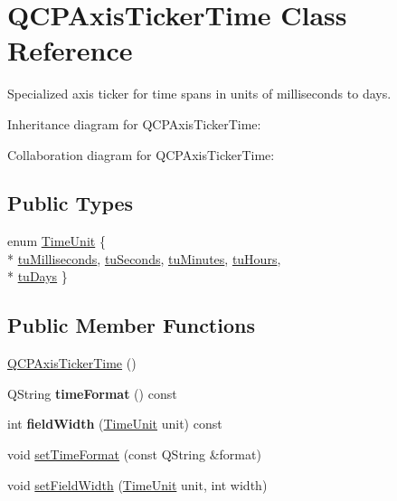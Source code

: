 \hypertarget{classQCPAxisTickerTime}{}\section{Q\+C\+P\+Axis\+Ticker\+Time Class Reference}
\label{classQCPAxisTickerTime}


Specialized axis ticker for time spans in units of milliseconds to days.  




Inheritance diagram for Q\+C\+P\+Axis\+Ticker\+Time\+:


Collaboration diagram for Q\+C\+P\+Axis\+Ticker\+Time\+:
\subsection*{Public Types}
\begin{DoxyCompactItemize}
\item 
enum \hyperlink{classQCPAxisTickerTime_a5c48ded8c6d3a1aca9b68219469fea3e}{Time\+Unit} \{ \\*
\hyperlink{classQCPAxisTickerTime_a5c48ded8c6d3a1aca9b68219469fea3ea809db637d2a7f601287c8790facc25cf}{tu\+Milliseconds}, 
\hyperlink{classQCPAxisTickerTime_a5c48ded8c6d3a1aca9b68219469fea3ea22b2c1842215272ae827eea2d1cc037d}{tu\+Seconds}, 
\hyperlink{classQCPAxisTickerTime_a5c48ded8c6d3a1aca9b68219469fea3ea682de6640daef46cffd8a080348d7d00}{tu\+Minutes}, 
\hyperlink{classQCPAxisTickerTime_a5c48ded8c6d3a1aca9b68219469fea3ea83a5713594424ba17f1f62f18f0e5935}{tu\+Hours}, 
\\*
\hyperlink{classQCPAxisTickerTime_a5c48ded8c6d3a1aca9b68219469fea3eaf9729e64545307a80a0e3527d6da6556}{tu\+Days}
 \}
\end{DoxyCompactItemize}
\subsection*{Public Member Functions}
\begin{DoxyCompactItemize}
\item 
\hyperlink{classQCPAxisTickerTime_a5145aac1d2117fdac411d9e8552cc41b}{Q\+C\+P\+Axis\+Ticker\+Time} ()
\item 
Q\+String {\bfseries time\+Format} () const \hypertarget{classQCPAxisTickerTime_a7131ca197593d941adaea6faa75249d0}{}\label{classQCPAxisTickerTime_a7131ca197593d941adaea6faa75249d0}

\item 
int {\bfseries field\+Width} (\hyperlink{classQCPAxisTickerTime_a5c48ded8c6d3a1aca9b68219469fea3e}{Time\+Unit} unit) const \hypertarget{classQCPAxisTickerTime_a13f16bf1335ab365a841496c27a6b71c}{}\label{classQCPAxisTickerTime_a13f16bf1335ab365a841496c27a6b71c}

\item 
void \hyperlink{classQCPAxisTickerTime_a2f30b6e5125bce4256be9ce3177088ea}{set\+Time\+Format} (const Q\+String \&format)
\item 
void \hyperlink{classQCPAxisTickerTime_adc13e54fc969be98a5c0e3fa0dbaa293}{set\+Field\+Width} (\hyperlink{classQCPAxisTickerTime_a5c48ded8c6d3a1aca9b68219469fea3e}{Time\+Unit} unit, int width)
\end{DoxyCompactItemize}
